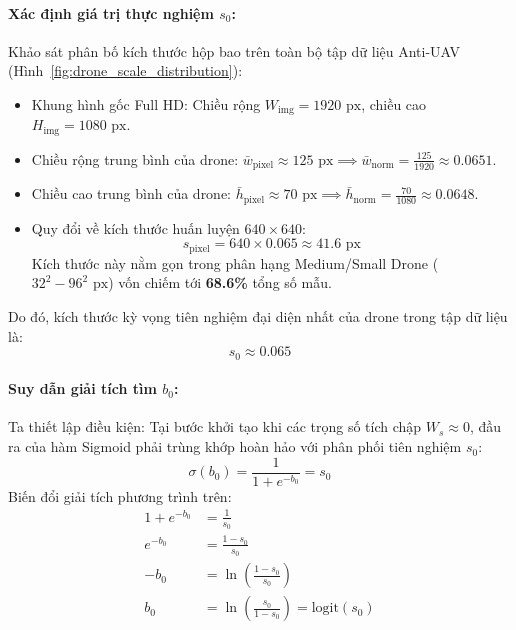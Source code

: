\documentclass[11pt,a4paper]{article}
\begin{document}
\paragraph{Xác định giá trị thực nghiệm $s_0$:}
Khảo sát phân bố kích thước hộp bao trên toàn bộ tập dữ liệu Anti-UAV (Hình~\ref{fig:drone_scale_distribution}):
\begin{itemize}
    \item Khung hình gốc Full HD: Chiều rộng $W_{\text{img}} = 1920\text{ px}$, chiều cao $H_{\text{img}} = 1080\text{ px}$.
    \item Chiều rộng trung bình của drone: $\bar{w}_{\text{pixel}} \approx 125\text{ px} \implies \bar{w}_{\text{norm}} = \frac{125}{1920} \approx 0.0651$.
    \item Chiều cao trung bình của drone: $\bar{h}_{\text{pixel}} \approx 70\text{ px} \implies \bar{h}_{\text{norm}} = \frac{70}{1080} \approx 0.0648$.
    \item Quy đổi về kích thước huấn luyện $640 \times 640$:
    \begin{equation}
        s_{\text{pixel}} = 640 \times 0.065 \approx 41.6\text{ px}
    \end{equation}
    Kích thước này nằm gọn trong phân hạng Medium/Small Drone ($32^2 - 96^2\text{ px}$) vốn chiếm tới \textbf{68.6\%} tổng số mẫu.
\end{itemize}
Do đó, kích thước kỳ vọng tiên nghiệm đại diện nhất của drone trong tập dữ liệu là:
\begin{equation}
    s_0 \approx 0.065
\end{equation}

\paragraph{Suy dẫn giải tích tìm $b_0$:}
Ta thiết lập điều kiện: Tại bước khởi tạo khi các trọng số tích chập $W_s \approx 0$, đầu ra của hàm Sigmoid phải trùng khớp hoàn hảo với phân phối tiên nghiệm $s_0$:
\begin{equation}
    \sigma(b_0) = \frac{1}{1 + e^{-b_0}} = s_0
\end{equation}
Biến đổi giải tích phương trình trên:
\begin{align}
    1 + e^{-b_0} &= \frac{1}{s_0} \\
    e^{-b_0} &= \frac{1 - s_0}{s_0} \\
    -b_0 &= \ln\left(\frac{1 - s_0}{s_0}\right) \\
    b_0 &= \ln\left(\frac{s_0}{1 - s_0}\right) = \text{logit}(s_0)
\end{align}
\end{document}
